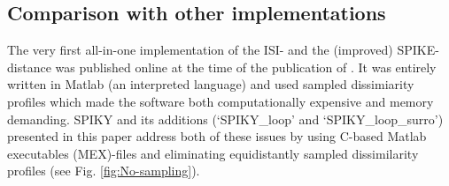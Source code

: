 \documentclass[10pt,twocolumn]{elsart5p}
\begin{document}
%
%






\subsection{\label{ss:Comparison} Comparison with other implementations}

 	

The very first all-in-one implementation of the ISI- and the (improved) SPIKE-distance was published online at the time of the publication of \cite{Kreuz13}. It was entirely written in Matlab (an interpreted language) and used sampled dissimiarity profiles which made the software both computationally expensive and memory demanding. SPIKY and its additions (`SPIKY\_loop' and `SPIKY\_loop\_surro') presented in this paper address both of these issues by using C-based Matlab executables (MEX)-files and eliminating equidistantly sampled dissimilarity profiles (see Fig. \ref{fig:No-sampling}).
\end{document}
